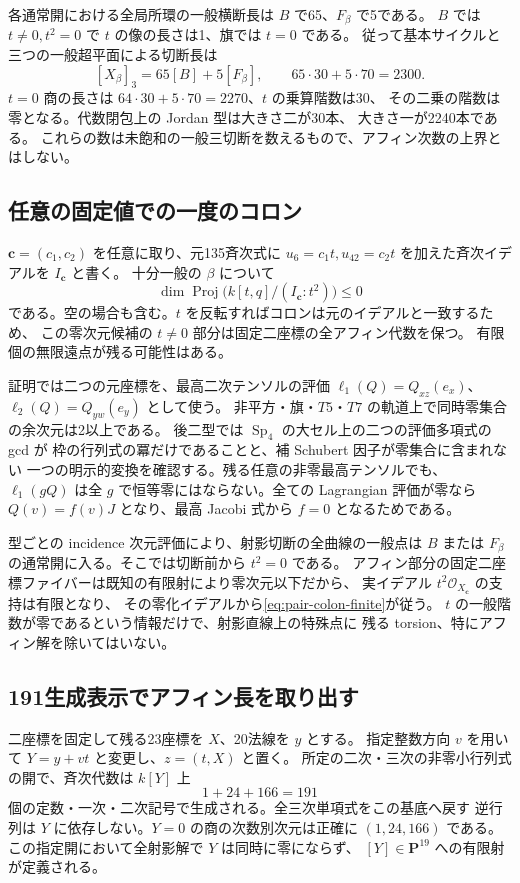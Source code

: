 \documentclass[11pt,a4paper]{ltjsarticle}
\newcommand{\PP}{\mathbf P}
\DeclareMathOperator{\Sp}{Sp}
\theoremstyle{remark}
\begin{document}
各通常開における全局所環の一般横断長は $B$ で65、$F_\beta$ で5である。
$B$ では $t\ne0,t^2=0$ で $t$ の像の長さは1、旗では $t=0$ である。
従って基本サイクルと三つの一般超平面による切断長は
\[
 [X_\beta]_3=65[B]+5[F_\beta],\qquad
 65\cdot30+5\cdot70=2300.
\]
$t=0$ 商の長さは $64\cdot30+5\cdot70=2270$、$t$ の乗算階数は30、
その二乗の階数は零となる。代数閉包上の Jordan 型は大きさ二が30本、
大きさ一が2240本である\cite{top-cycle-v60}。
これらの数は未飽和の一般三切断を数えるもので、アフィン次数の上界とはしない。

\subsection{任意の固定値での一度のコロン}
$\mathbf c=(c_1,c_2)$ を任意に取り、元135斉次式に
$u_6=c_1t,u_{42}=c_2t$ を加えた斉次イデアルを $I_{\mathbf c}$ と書く。
十分一般の $\beta$ について
\begin{equation}\label{eq:pair-colon-finite}
 \dim\operatorname{Proj}\bigl(k[t,q]/(I_{\mathbf c}:t^2)\bigr)\le0
\end{equation}
である。空の場合も含む。$t$ を反転すればコロンは元のイデアルと一致するため、
この零次元候補の $t\ne0$ 部分は固定二座標の全アフィン代数を保つ。
有限個の無限遠点が残る可能性はある\cite{single-colon-v60}。

証明では二つの元座標を、最高二次テンソルの評価
$\ell_1(Q)=Q_{xz}(e_x)$、$\ell_2(Q)=Q_{yw}(e_y)$ として使う。
非平方・旗・$T5$・$T7$ の軌道上で同時零集合の余次元は2以上である。
後二型では $\Sp_4$ の大セル上の二つの評価多項式の gcd が
枠の行列式の冪だけであることと、補 Schubert 因子が零集合に含まれない
一つの明示的変換を確認する。残る任意の非零最高テンソルでも、
$\ell_1(gQ)$ は全 $g$ で恒等零にはならない。全ての Lagrangian 評価が零なら
$Q(v)=f(v)J$ となり、最高 Jacobi 式から $f=0$ となるためである。

型ごとの incidence 次元評価により、射影切断の全曲線の一般点は
$B$ または $F_\beta$ の通常開に入る。そこでは切断前から $t^2=0$ である。
アフィン部分の固定二座標ファイバーは既知の有限射により零次元以下だから、
実イデアル $t^2\mathcal O_{X_{\mathbf c}}$ の支持は有限となり、
その零化イデアルから\eqref{eq:pair-colon-finite}が従う。
$t$ の一般階数が零であるという情報だけで、射影直線上の特殊点に
残る torsion、特にアフィン解を除いてはいない。

\subsection{191生成表示でアフィン長を取り出す}
二座標を固定して残る23座標を $X$、20法線を $y$ とする。
指定整数方向 $v$ を用いて $Y=y+vt$ と変更し、$z=(t,X)$ と置く。
所定の二次・三次の非零小行列式の開で、斉次代数は $k[Y]$ 上
\[
 1+24+166=191
\]
個の定数・一次・二次記号で生成される。全三次単項式をこの基底へ戻す
逆行列は $Y$ に依存しない。$Y=0$ の商の次数別次元は正確に $(1,24,166)$ である。
この指定開において全射影解で $Y$ は同時に零にならず、
$[Y]\in\PP^{19}$ への有限射が定義される\cite{finite-t-action-v60}。
\end{document}

